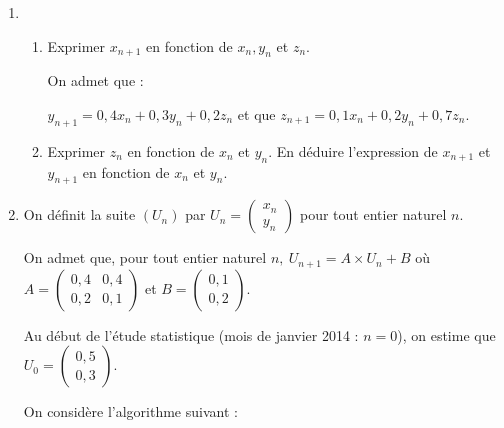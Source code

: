 \documentclass[10pt]{article}
\begin{document}
\medskip
 
\begin{enumerate}
\item 
	\begin{enumerate}
		\item Exprimer $x_{n+1}$ en fonction de $x_{n}, y_{n}$ et $z_{n}$.
		 
On admet que : 

$y_{n+1} = 0,4x_{n} + 0,3y_{n} + 0,2z_{n}$ et que $z_{n+1} = 0,1x_{n} + 0,2y_{n} + 0,7 z_{n}$.
		\item Exprimer $z_{n}$ en fonction de $x_{n}$ et $y_{n}$. En déduire l'expression de $x_{n+1}$ et $y_{n+1}$ en fonction de $x_{n}$ et $y_{n}$.
	\end{enumerate} 
\item On définit la suite $\left(U_{n}\right)$ par $U_{n} = \begin{pmatrix}x_{n}\\y_{n}\end{pmatrix}$ pour tout entier naturel $n$. 

On admet que, pour tout entier naturel $n,\: U_{n+1} = A \times U_{n} + B$ où $A = \begin{pmatrix}0,4&0,4\\0,2&0,1\end{pmatrix}$	et $B = \begin{pmatrix}0,1\\0,2\end{pmatrix}$.

Au début de l'étude statistique (mois de janvier 2014 : $n = 0$), on estime que $U_{0} = \begin{pmatrix}0,5\\0,3\end{pmatrix}$. 

On considère l'algorithme suivant :


\end{enumerate}
\end{document}
